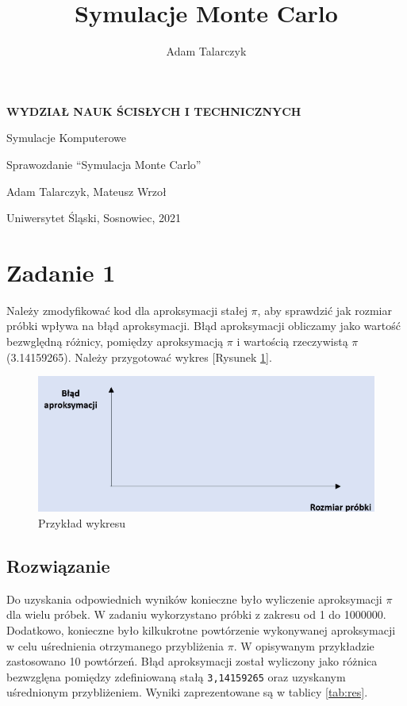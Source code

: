 \documentclass[a4paper,11pt,titlepage]{article}
\author{Adam Talarczyk}
\title{Symulacje Monte Carlo}
\begin{document}
\begin{titlepage}
    \begin{center}

        \Huge
        \textbf{WYDZIAŁ NAUK ŚCISŁYCH I TECHNICZNYCH}
        
        
        \vspace{1.5cm}
	   Symulacje Komputerowe
        \LARGE
        
	\vspace{2cm}
	
	Sprawozdanie ``Symulacja Monte Carlo''

	\vspace{1cm}
	Adam Talarczyk, Mateusz Wrzoł
	
	\vspace{5cm}
        \vfill

        \vspace{0.8cm}
	\Large
        Uniwersytet Śląski, Sosnowiec, 2021

    \end{center}
\end{titlepage}
\newpage



\section{Zadanie 1}
Należy zmodyfikować kod dla aproksymacji stałej $\pi$, aby sprawdzić jak rozmiar próbki wpływa na błąd aproksymacji. Błąd aproksymacji obliczamy jako wartość bezwględną różnicy, pomiędzy aproksymacją $\pi$ i wartością rzeczywistą $\pi$ (3.14159265). Należy przygotować wykres [Rysunek \ref{fig:wykres1}].

\begin{figure}[H]
\centering
\includegraphics[width=1\columnwidth]{img/zad1.PNG}
\caption{Przykład wykresu}
\label{fig:wykres1}
\end{figure}

\subsection{Rozwiązanie}
Do uzyskania odpowiednich wyników konieczne było wyliczenie aproksymacji $\pi$ dla wielu próbek. W zadaniu wykorzystano próbki z zakresu od 1 do 1000000. Dodatkowo, konieczne było kilkukrotne powtórzenie wykonywanej aproksymacji w celu uśrednienia otrzymanego przybliżenia $\pi$. W opisywanym przykładzie zastosowano 10 powtórzeń. Błąd aproksymacji został wyliczony jako różnica bezwzglęna pomiędzy zdefiniowaną stałą \verb|3,14159265| oraz uzyskanym uśrednionym przybliżeniem. Wyniki zaprezentowane są w tablicy \ref{tab:res}.
\end{document}
